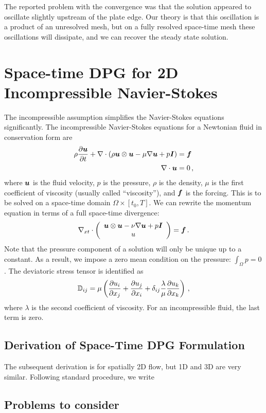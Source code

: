 \documentclass[Proposal.tex]{subfiles}
\begin{document}
The reported problem with the convergence was that the solution appeared to oscillate slightly upstream of the plate edge.
Our theory is that this oscillation is a product of an unresolved mesh, but on a fully resolved space-time mesh these oscillations will dissipate, 
and we can recover the steady state solution.

\section{Space-time DPG for 2D Incompressible Navier-Stokes}
The incompressible assumption simplifies the Navier-Stokes equations significantly.
The incompressible Navier-Stokes equations for a Newtonian fluid in conservation form are
\begin{align*}
  \rho\frac{\partial\boldsymbol u}{\partial t}+\nabla\cdot\left( \rho\boldsymbol u\otimes\boldsymbol u-\mu\nabla\boldsymbol u+p\boldsymbol I \right)&=\boldsymbol f\\
  \nabla\cdot\boldsymbol u&=0\,,
\end{align*}
where $\boldsymbol u$ is the fluid velocity, $p$ is the pressure, $\rho$ is the density, $\mu$ is the first coefficient of viscosity (usually called ``viscosity''), 
and $\boldsymbol f$ is the forcing. 
This is to be solved on a space-time domain $\Omega\times[t_0,T]$.
We can rewrite the momentum equation in terms of a full space-time divergence:
\begin{equation}
\nabla_{xt}\cdot\left( \begin{array}{c} \boldsymbol u\otimes\boldsymbol u-\nu\nabla\boldsymbol u+p\boldsymbol I\\ u\\ \end{array} \right)=\boldsymbol f\,.
\end{equation}
Note that the pressure component of a solution will only be unique up to a constant. 
As a result, we impose a zero mean condition on the pressure: $\int_\Omega p=0$.
The deviatoric stress tensor is identified as
\begin{equation}
	\mathbb{D}_{ij}=\mu\left( \frac{\partial u_i}{\partial x_j}+\frac{\partial u_j}{\partial x_i}
	+\delta_{ij}\frac{\lambda}{\mu}\frac{\partial u_k}{\partial x_k} \right)\,,
\end{equation}
where $\lambda$ is the second coefficient of viscosity.
For an incompressible fluid, the last term is zero.

\subsection{Derivation of Space-Time DPG Formulation}
The subsequent derivation is for spatially 2D flow, but 1D and 3D are very similar.
Following standard procedure, we write

\subsection{Problems to consider}
\end{document}
